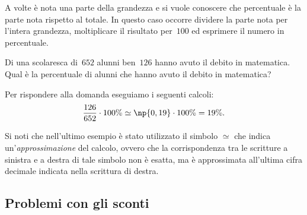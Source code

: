 A volte è nota una parte della grandezza e si vuole conoscere che percentuale è
la parte nota rispetto al totale. In questo caso occorre dividere la parte nota per l'intera grandezza,
moltiplicare il risultato per~$100$ ed esprimere il numero in percentuale.

\begin{exrig}
\begin{esempio}
Di una scolaresca di~$652$ alunni ben~$126$ hanno avuto il debito in matematica.
Qual è la percentuale di alunni che hanno avuto il debito in matematica?

Per rispondere alla domanda eseguiamo i seguenti calcoli:
\[\frac{126}{652}\cdot100\%\simeq\np{0,19}\cdot100\%=19\%.\]
\end{esempio}
\end{exrig}

Si noti che nell'ultimo esempio è stato utilizzato il simbolo $\simeq$ che indica un'\emph{approssimazione} del calcolo, ovvero che la corrispondenza tra le scritture a sinistra e a destra di tale simbolo non è esatta, ma è approssimata all'ultima cifra decimale indicata nella scrittura di destra.

\subsection{Problemi con gli sconti}

